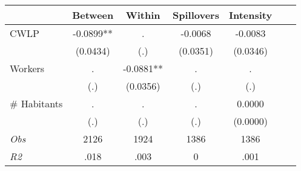 \begin{tabular}{l*{6}{c}}\hline&\multicolumn{1}{c}{Between}&\multicolumn{1}{c}{Within}&\multicolumn{1}{c}{Spillovers}&\multicolumn{1}{c}{Intensity}\\ \hline 
CWLP & -0.0899** & . & -0.0068 & -0.0083 \\
 & (0.0434) & (.) & (0.0351) & (0.0346) \\
Workers & . & -0.0881** & . & . \\
 & (.) & (0.0356) & (.) & (.) \\
\# Habitants & . & . & . & 0.0000 \\
  & (.) & (.) & (.) & (0.0000) \\
\hline \textit{Obs} & 2126 & 1924 & 1386 & 1386  \\ \textit{R2} & .018 & .003 & 0 & .001 \\ \hline \end{tabular}
